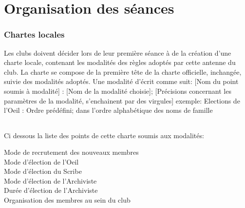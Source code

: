 \documentclass[a4paper,11pt]{article}
\begin{document}
\newpage
\part{Organisation des séances}

\section{Chartes locales}
Les clubs doivent décider lors de leur première séance à de la création d'une charte locale, contenant les modalités des règles adoptés par cette antenne du club. La charte se compose de la première tête de la charte officielle, inchangée, suivie des modalités adoptés. Une modalité d'écrit comme suit:
[Nom du point soumis à modalité] : [Nom de la modalité choisie]; [Précisions concernant les paramètres de la modalité, s'enchainent par des virgules]
exemple: Elections de l'Oeil : Ordre prédéfini; dans l'ordre alphabétique des noms de famille

\paragraph{}
Ci dessous la liste des points de cette charte soumis aux modalités:
\begin{description}
 \item [Mode de recrutement des nouveaux membres]
 \item [Mode d'élection de l'Oeil]
 \item [Mode d'élection du Scribe]
 \item [Mode d'élection de l'Archiviste]
 \item [Durée d'élection de l'Archiviste]
 \item [Organisation des membres au sein du club]
\end{description}
\end{document}
